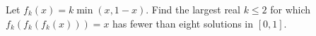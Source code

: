 Let $ f_k(x)=k\min(x,1-x)$. Find the largest real $ k\le2 $ for which $ f_k(f_k(f_k(x)))=x $ has fewer than eight solutions in $[0,1]$.
